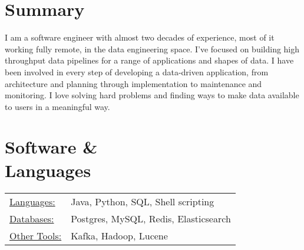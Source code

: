 \documentclass[margin]{res}
\begin{document}

\address{Baltimore, MD --- (917) 678 3636 \\
\href{mailto:mark.tozzi@gmail.com}{mark.tozzi@gmail.com}
$\bullet$ \href{https://github.com/not-napoleon}{github: not-napoleon}
$\bullet$ \href{https://www.marktozzi.com/}{personal website}
}


\begin{resume}

\section{Summary}
I am a software engineer with almost two decades of experience, most of it working
fully remote, in the data engineering space.  I've focused on building high
throughput data pipelines for a range of applications and shapes of data.
I have been involved in every step of developing a data-driven application,
from architecture and planning through implementation to maintenance and
monitoring.  I love solving hard problems and finding ways to make data
available to users in a meaningful way.

\section{Software \& \\ Languages}
   \begin{tabular}{l p{3in}}
     \underline{Languages:} & Java, Python, SQL, Shell scripting \\
     \underline{Databases:} & Postgres, MySQL, Redis, Elasticsearch \\
     \underline{Other Tools:} & Kafka, Hadoop, Lucene
   \end{tabular}

\raggedright{}

\end{resume}
\end{document}
